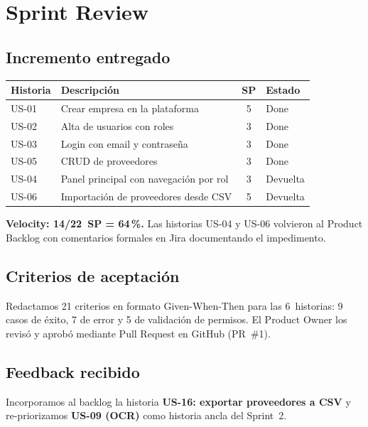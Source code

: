 \documentclass[11pt,a4paper]{article}
\begin{document}
\section{Sprint Review}

\subsection{Incremento entregado}

\begin{center}
\begin{tabular}{llcl}
\toprule
\textbf{Historia} & \textbf{Descripción} & \textbf{SP} & \textbf{Estado} \\
\midrule
US-01 & Crear empresa en la plataforma & 5 & \textcolor{green!60!black}{Done} \\
US-02 & Alta de usuarios con roles & 3 & \textcolor{green!60!black}{Done} \\
US-03 & Login con email y contraseña & 3 & \textcolor{green!60!black}{Done} \\
US-05 & CRUD de proveedores & 3 & \textcolor{green!60!black}{Done} \\
\midrule
US-04 & Panel principal con navegación por rol & 3 & \textcolor{red!70!black}{Devuelta} \\
US-06 & Importación de proveedores desde CSV & 5 & \textcolor{red!70!black}{Devuelta} \\
\bottomrule
\end{tabular}
\end{center}

\textbf{Velocity: 14/22~SP = 64\,\%.} Las historias US-04 y US-06
volvieron al Product Backlog con comentarios formales en Jira
documentando el impedimento.

\subsection{Criterios de aceptación}

Redactamos 21 criterios en formato Given-When-Then para las 6~historias:
9 casos de éxito, 7 de error y 5 de validación de permisos. El Product
Owner los revisó y aprobó mediante Pull Request en GitHub (PR~\#1).

\subsection{Feedback recibido}

Incorporamos al backlog la historia \textbf{US-16: exportar proveedores
a CSV} y re-priorizamos \textbf{US-09 (OCR)} como historia ancla del
Sprint~2.
\end{document}
